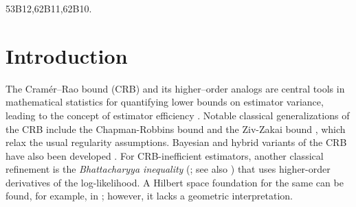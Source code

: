 \documentclass[3p,times]{elsarticle}
\begin{document}
\begin{frontmatter}
\begin{abstract}
The obstruction to such finite--order integrability is identified with the vertical component of the canonical Ehresmann connection on the jet tower, which coincides with the curvature correction term in variance bounds.
This establishes a direct correspondence between algebraic projection conditions in \( L^2(\mu) \) and intrinsic holonomy properties of statistical sections, yielding a unified geometric interpretation of higher--order information inequalities.
\end{abstract}


\begin{keyword}
\MSC 53B12\sep 62B11\sep 62B10.



\end{keyword}

\end{frontmatter}


\section{Introduction}
\label{sec:intro}

The Cramér--Rao bound (CRB) and its higher--order analogs are central tools in
mathematical statistics for quantifying lower bounds on estimator variance, leading to the concept of estimator efficiency \cite{rao,vaart,schervish}. Notable classical generalizations of the CRB include the Chapman-Robbins bound \cite{chapman_robbins} and the Ziv-Zakai bound \cite{ziv_zakai}, which relax the usual regularity assumptions. Bayesian and hybrid variants of the CRB have also been developed \cite{hybrid_crb}. 
For CRB-inefficient estimators, another classical refinement is the \emph{Bhattacharyya inequality} (\cite{b1946}; see also \cite{ZS,l1998}) that uses higher-order derivatives of the log-likelihood. A Hilbert space foundation for the same can be found, for example, in \cite{pillai}; however, it lacks a geometric interpretation. 
\end{document}
